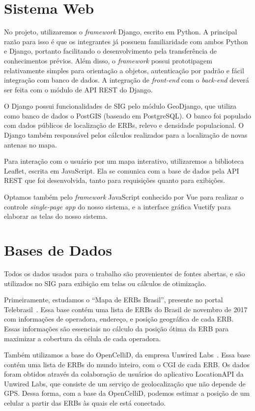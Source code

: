 \documentclass[]{politex}
\begin{document}
\section{Sistema Web}

No projeto, utilizaremos o \textit{framework} Django, escrito em Python. A
principal razão para isso é que os integrantes já possuem familiaridade com
ambos Python e Django, portanto facilitando o desenvolvimento pela transferência
de conhecimentos prévios. Além disso, o \textit{framework} possui prototipagem
relativamente simples para orientação a objetos, autenticação por padrão e fácil
integração com banco de dados. A integração de \textit{front-end} com o
\textit{back-end} deverá ser feita com o módulo de API REST do Django.

O Django possui funcionalidades de SIG pelo módulo GeoDjango, que utiliza como
banco de dados o PostGIS (baseado em PostgreSQL). O banco foi populado com dados
públicos de localização de ERBs, relevo e densidade populacional. O Django
também responsável pelos cálculos realizados para a localização de novas antenas
no mapa.

Para interação com o usuário por um mapa interativo, utilizaremos a biblioteca
Leaflet, escrita em JavaScript. Ela se comunica com a base de dados pela API
REST que foi desenvolvida, tanto para requisições quanto para exibições.

Optamos também pelo \textit{framework} JavaScript conhecido por Vue para
realizar o controle \emph{single-page app} do nosso sistema, e a interface
gráfica Vuetify para elaborar as telas do nosso sistema.

\section{Bases de Dados}

Todos os dados usados para o trabalho são provenientes de fontes abertas, e são
utilizados no SIG para exibição em telas ou cálculos de otimização.

Primeiramente, estudamos o ``Mapa de ERBs Brasil'', presente no portal
Telebrasil~\cite{mapa-erb}. Essa base contém uma lista de ERBs do Brasil de
novembro de 2017 com informações de operadora, endereço, e posição geográfica de
cada ERB. Essas informações são essenciais no cálculo da posição ótima da ERB
para maximizar a cobertura da célula de cada operadora.

Também utilizamos a base do OpenCelliD, da empresa Unwired
Labs~\cite{opencellid}. Essa base contém uma lista de ERBs do mundo inteiro, com
o CGI de cada ERB. Os dados foram obtidos através da colaboração de usuários do
aplicativo LocationAPI da Unwired Labs, que consiste de um serviço de
geolocalização que não depende de GPS. Dessa forma, com a base da OpenCelliD,
podemos estimar a posição de um celular a partir das ERBs às quais ele está
conectado.
\end{document}
